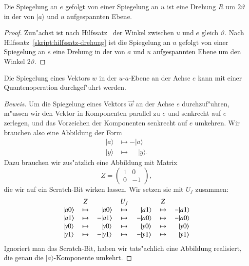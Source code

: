 \begin{hilfssatz}
Die Spiegelung an $e$ gefolgt von einer Spiegelung an $u$ 
ist eine Drehung $R$ um $2\vartheta$ in der von $|a\rangle$ und $u$
aufgespannten Ebene.
\label{skript:hilfssatz-schritt}
\end{hilfssatz}

\begin{proof}
Zun"achst ist nach Hilfssatz~\label{skript:hilfssatz-winkel}
der Winkel zwischen $u$ und $e$ gleich $\vartheta$.
Nach Hilfssatz~\ref{skript:hilfssatz-drehung} ist die Spiegelung
an $u$ gefolgt von einer Spiegelung an $e$ eine Drehung in der
von $a$ und $u$ aufgespannten Ebene um den Winkel $2\vartheta$.
\end{proof}

\begin{hilfssatz}
Die Spiegelung eines Vektors $w$ in der $u$-$a$-Ebene an
der Achse $e$ kann mit einer Quantenoperation durchgef"uhrt werden.
\label{skript:hilfssatz-spiegelung-e}
\end{hilfssatz}

\begin{proof}[Beweis]
Um die Spiegelung eines Vektors $\vec w$ an der Achse $e$ durchzuf"uhren,
m"ussen wir den Vektor in Komponenten parallel zu $e$ und senkrecht
auf $e$ zerlegen, und das Vorzeichen der Komponenten senkrecht auf
$e$ umkehren.
Wir brauchen also eine Abbildung der Form
\begin{align*}
|a\rangle&\mapsto -|a\rangle\\
|y\rangle&\mapsto \phantom{-}|y\rangle.
\end{align*}
Dazu brauchen wir zus"atzlich eine Abbildung mit Matrix
\[
Z=\begin{pmatrix}
1&0\\0&-1
\end{pmatrix},
\]
die wir auf ein Scratch-Bit wirken lassen.
Wir setzen sie mit $U_f$ zusammen:
\begin{equation}
\begin{tabular}{
>{$}l<{$}
>{$}c<{$}
>{$}l<{$}
>{$}c<{$}
>{$}l<{$}
>{$}c<{$}
>{$}l<{$}
}
          &Z      &                     &U_f    &                     &Z      &                     \\
|a0\rangle&\mapsto&\phantom{-}|a0\rangle&\mapsto&\phantom{-}|a1\rangle&\mapsto&         - |a1\rangle\\
|a1\rangle&\mapsto&         - |a1\rangle&\mapsto&         - |a0\rangle&\mapsto&         - |a0\rangle\\
|y0\rangle&\mapsto&\phantom{-}|y0\rangle&\mapsto&\phantom{-}|y0\rangle&\mapsto&\phantom{-}|y0\rangle\\
|y1\rangle&\mapsto&         - |y1\rangle&\mapsto&         - |y1\rangle&\mapsto&\phantom{-}|y1\rangle
\end{tabular}
\end{equation}
Ignoriert man das Scratch-Bit, haben wir tats"achlich eine Abbildung realisiert,
die genau die $|a\rangle$-Komponente umkehrt.
\end{proof}

